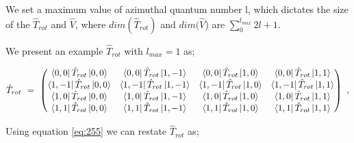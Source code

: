 \documentclass{article}
\begin{document}
We set a maximum value of azimuthal quantum number l, which dictates the size of the \begin{math} \hat{T}_{rot} \end{math} and \begin{math} \hat{V} \end{math}, where \begin{math} dim(\hat{T}_{rot}) \end{math} and \begin{math} dim(\hat{V} \end{math}) are \begin{math} \sum_{0}^{l_{max}} 2l + 1 \end{math}. 

We present an example \begin{math} \hat{T}_{rot} \end{math} with \begin{math} l_{max} = 1 \end{math} as;

\begin{equation} \label{eq:266}
\hat{T}_{rot} \hspace{0.125cm} = \hspace{0.125cm} \begin{pmatrix} \bra{0,0}\hat{T}_{rot}\ket{0,0} & \bra{0,0}\hat{T}_{rot}\ket{1,-1} & \bra{0,0}\hat{T}_{rot}\ket{1,0} & \bra{0,0}\hat{T}_{rot}\ket{1,1} \\ \bra{1,-1}\hat{T}_{rot}\ket{0,0} & \bra{1,-1}\hat{T}_{rot}\ket{1,-1} & \bra{1,-1}\hat{T}_{rot}\ket{1,0} & \bra{1,-1}\hat{T}_{rot}\ket{1,1} \\ \bra{1,0}\hat{T}_{rot}\ket{0,0} & \bra{1,0}\hat{T}_{rot}\ket{1,-1} & \bra{1,0}\hat{T}_{rot}\ket{1,0} & \bra{1,0}\hat{T}_{rot}\ket{1,1} \\ \bra{1,1}\hat{T}_{rot}\ket{0,0} & \bra{1,1}\hat{T}_{rot}\ket{1,-1} & \bra{1,1}\hat{T}_{rot}\ket{1,0} & \bra{1,1}\hat{T}_{rot}\ket{1,1}
\end{pmatrix} \hspace{0.125cm} ,
\end{equation} 

Using equation \ref{eq:255} we can restate \begin{math} \hat{T}_{rot} \end{math} as;
\end{document}
